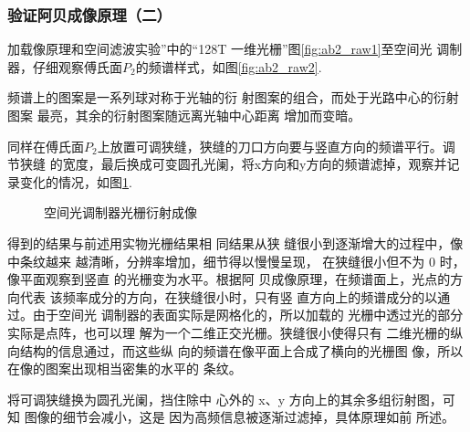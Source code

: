 \documentclass[10pt,a4paper,twoside,UTF8]{ctexart}
\begin{document}
\subsubsection{验证阿贝成像原理（二）}
加载像原理和空间滤波实验”中的“128T 一维光栅”图\ref{fig:ab2_raw1}至空间光
调制器，仔细观察傅氏面$P_2$的频谱样式，如图\ref{fig:ab2_raw2}.
\begin{figure}[H]
	\centering
	\caption{}
\end{figure}

频谱上的图案是一系列球对称于光轴的衍
射图案的组合，而处于光路中心的衍射图案
最亮，其余的衍射图案随远离光轴中心距离
增加而变暗。

同样在傅氏面$P_2$上放置可调狭缝，狭缝的刀口方向要与竖直方向的频谱平行。调节狭缝
的宽度，最后换成可变圆孔光阑，将x方向和y方向的频谱滤掉，观察并记录变化的情况，如图\ref{fig:ab2}.

\begin{figure}[H]
	\centering

	\caption{空间光调制器光栅衍射成像}
	\label{fig:ab2}
\end{figure}

得到的结果与前述用实物光栅结果相
同结果从狭
缝很小到逐渐增大的过程中，像中条纹越来
越清晰，分辨率增加，细节得以慢慢呈现，
在狭缝很小但不为 0 时，像平面观察到竖直
的光栅变为水平。根据阿
贝成像原理，在频谱面上，光点的方向代表
该频率成分的方向，在狭缝很小时，只有竖
直方向上的频谱成分的以通过。由于空间光
调制器的表面实际是网格化的，所以加载的
光栅中透过光的部分实际是点阵，也可以理
解为一个二维正交光栅。狭缝很小使得只有
二维光栅的纵向结构的信息通过，而这些纵
向的频谱在像平面上合成了横向的光栅图
像，所以在像的图案出现相当密集的水平的
条纹。

将可调狭缝换为圆孔光阑，挡住除中
心外的 x、y 方向上的其余多组衍射图，可知
图像的细节会减小，这是
因为高频信息被逐渐过滤掉，具体原理如前
所述。
\end{document}
